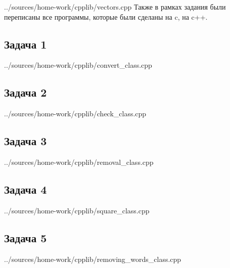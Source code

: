 \documentclass[12pt,a4paper]{report}
\begin{document}

{../sources/home-work/cpplib/vectors.cpp}
Также в рамках задания были переписаны все программы, которые были сделаны на c, на c++.
\subsection{Задача 1}

{../sources/home-work/cpplib/convert_class.cpp}
\subsection{Задача 2}

{../sources/home-work/cpplib/check_class.cpp}
\subsection{Задача 3}

{../sources/home-work/cpplib/removal_class.cpp}
\subsection{Задача 4}

{../sources/home-work/cpplib/square_class.cpp}
\subsection{Задача 5}

{../sources/home-work/cpplib/removing_words_class.cpp}
\end{document}
